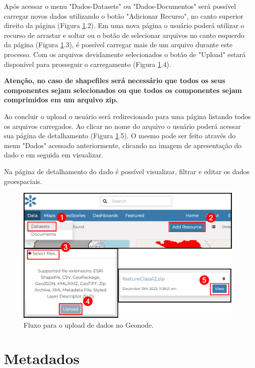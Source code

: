 \documentclass[12pt]{article}
\begin{document}
Após acessar o menu "Dados-Datasets" ou "Dados-Documentos" será possível
carregar novos dados utilizando o botão "Adicionar Recurso", no canto superior
direito da página (Figura \ref{fig:upload}.2). Em uma nova página o usuário
poderá utilizar o recurso de arrastar e soltar ou o botão de selecionar
arquivos no canto esquerdo da página (Figura \ref{fig:upload}.3), é possível
carregar mais de um arquivo durante este processo. Com os arquivos devidamente
selecionados o botão de "Upload" estará disponível para prosseguir o
carregamento (Figura \ref{fig:upload}.4). 

\textbf{Atenção, no caso de shapefiles será necessário que todos os seus
componentes sejam selecionados ou que todos os componentes sejam comprimidos em
um arquivo zip.}

Ao concluir o upload o usuário será redirecionado para uma página listando
todos os arquivos carregados. Ao clicar no nome do arquivo o usuário poderá
acessar sua página de detalhamento (Figura \ref{fig:upload}.5). O mesmo pode
ser feito através do menu "Dados" acessado anteriormente, clicando na imagem de
apresentação do dado e em seguida em visualizar.

Na página de detalhamento do dado é possível visualizar, filtrar e editar os
dados geoespaciais.

\begin{figure}[h]
  \centering
  \includegraphics[width=\textwidth, keepaspectratio]{img/upload.pdf}
  \caption{Fluxo para o upload de dados no Geonode.}
  \label{fig:upload}
\end{figure}

\section{Metadados}
\end{document}
